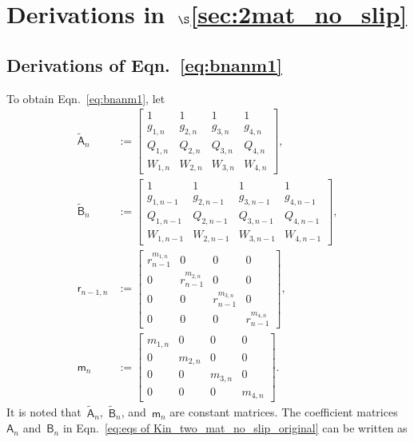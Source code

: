 \documentclass[preprint,10pt,times]{elsarticle}
\numberwithin{equation}{section}
\renewcommand{\u}[1]{\boldsymbol{#1}}
\newcommand{\usf}[1]{\u{\mathsf #1}}
\renewcommand{\>}{$\Rightarrow$}
\begin{document}
\section{Derivations in~$\S$\ref{sec:2mat_no_slip}}
\label{Appen:derivations}
\subsection{Derivations of Eqn.~\eqref{eq:bnanm1}}
\label{Appen:Eqn315}
To obtain Eqn.~\eqref{eq:bnanm1}, let
\begin{subequations}
\begin{align}
	\tilde{\usf{A}}_{n}
	& :=
	\begin{bmatrix}
		1 & 1 & 1 & 1 \\
		g_{1,n} & g_{2,n} & g_{3,n} & g_{4,n} \\
		Q_{1,n} & Q_{2,n} & Q_{3,n} & Q_{4,n} \\
		W_{1,n} & W_{2,n} & W_{3,n} & W_{4,n}
	\end{bmatrix}, \\
	\tilde{\usf{B}}_{n}
	& :=
	\begin{bmatrix}
		1 & 1 & 1 & 1 \\
		g_{1,n-1} & g_{2,n-1} & g_{3,n-1} & g_{4,n-1} \\
		Q_{1,n-1} & Q_{2,n-1} & Q_{3,n-1} & Q_{4,n-1} \\
		W_{1,n-1} & W_{2,n-1} & W_{3,n-1} & W_{4,n-1}
	\end{bmatrix}, \\
	\usf{r}_{n-1,n}
	& :=
	\begin{bmatrix}
		r_{n-1}^{m_{1,n}} & 0 & 0 & 0 \\
		0 & r_{n-1}^{m_{2,n}} & 0 & 0 \\
		0 & 0 & r_{n-1}^{m_{3,n}} & 0 \\
		0 & 0 & 0 & r_{n-1}^{m_{4,n}}
	\end{bmatrix}, \\
	\usf{m}_{n}
	& :=
	\begin{bmatrix}
		m_{1,n} & 0 & 0 & 0 \\
		0 & m_{2,n} & 0 & 0 \\
		0 & 0 & m_{3,n} & 0 \\
		0 & 0 & 0 & m_{4,n}
	\end{bmatrix}.
	\end{align}
	\label{eq:C1}
\end{subequations}
It is noted that~$\tilde{\usf{A}}_{n}$,~$\tilde{\usf{B}}_{n}$, and~$\usf{m}_{n}$ are constant matrices. The coefficient matrices~$\usf{A}_n$ and~$\usf{B}_n$ in Eqn.~\eqref{eq:eqs of Kin_two_mat_no_slip_original} can be written as
\end{document}
